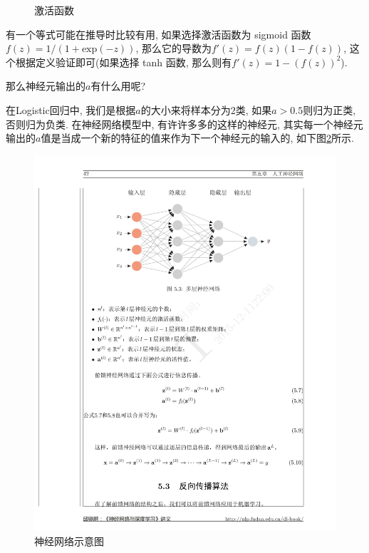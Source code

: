 \documentclass[a4paper,UTF8]{ctexart}
\theoremstyle{plain} \newtheorem{theorem}{定理}[section]
\theoremstyle{plain} \newtheorem{definition}{定义}[section]
\theoremstyle{plain} \newtheorem{lemma}{引理}[section]
\theoremstyle{plain} \newtheorem{proposition}{命题}[section]
\theoremstyle{plain} \newtheorem{example}{例}[section]
\theoremstyle{plain} \newtheorem{remark}{注}[section]
\theoremstyle{plain} \newtheorem{corollary}{推论}[section]
\begin{document}
\begin{figure}[!htb]
  \centering
  \hspace{0.2in}
  \caption{激活函数}
  \label{activate}
\end{figure}

有一个等式可能在推导时比较有用, 如果选择激活函数为 sigmoid 函数$f(z) = 1 / (1 + \mathrm{exp} (-z))$, 那么它的导数为$f'(z) = f(z) (1 - f(z))$, 这个根据定义验证即可(如果选择 tanh 函数, 那么则有$f'(z) = 1 - (f(z))^2$).

那么神经元输出的$a$有什么用呢?

在Logistic回归中, 我们是根据$a$的大小来将样本分为$2$类, 如果$a > 0.5$则归为正类, 否则归为负类. 在神经网络模型中, 有许许多多的这样的神经元, 其实每一个神经元输出的$a$值是当成一个新的特征的值来作为下一个神经元的输入的, 如下图\ref{neuralnet}所示.
\begin{figure}[!htb]
  \centering
  \includegraphics[width = 0.80 \textwidth]{neuralnetwork.pdf}
  \caption{神经网络示意图}
  \label{neuralnet}
\end{figure}
\end{document}
